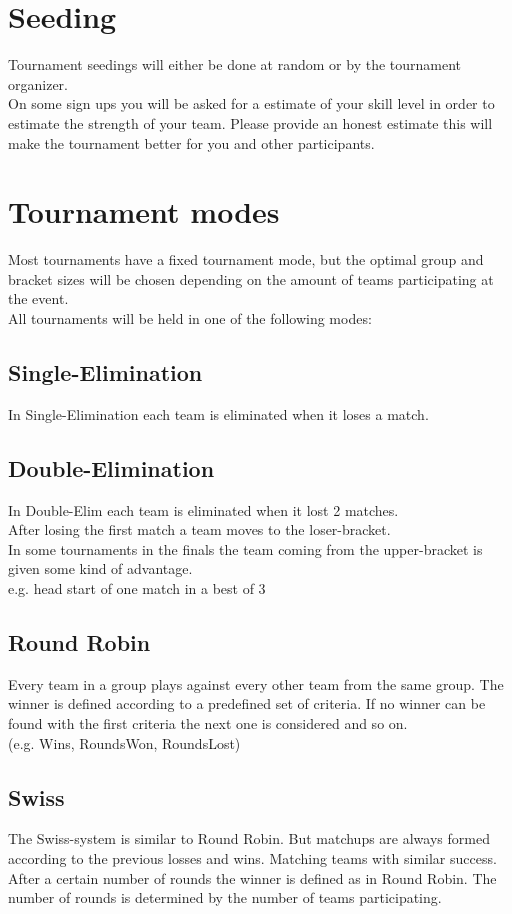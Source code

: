 \documentclass{article}
\begin{document}
\section{Seeding}
Tournament seedings will either be done at random or by the tournament organizer.\\
On some sign ups you will be asked for a estimate of your skill level in order to estimate the strength of your team.
Please provide an honest estimate this will make the tournament better for you and other participants.


\section{Tournament modes}
Most tournaments have a fixed tournament mode, but the optimal group and bracket sizes will be chosen depending on the amount of teams participating at the event.\\
All tournaments will be held in one of the following modes:

\subsection{Single-Elimination}
In Single-Elimination each team is eliminated when it loses a match.\\


\subsection{Double-Elimination}
In Double-Elim each team is eliminated when it lost 2 matches.\\
After losing the first match a team moves to the loser-bracket.\\
In some tournaments in the finals the team coming from the upper-bracket is given some kind of advantage.\\
e.g. head start of one match in a best of 3

\subsection{Round Robin}
Every team in a group plays against every other team from the same group.
The winner is defined according to a predefined set of criteria.
If no winner can be found with the first criteria the next one is considered and so on.\\
(e.g. Wins, RoundsWon, RoundsLost)

\subsection{Swiss}
The Swiss-system is similar to Round Robin. But matchups are always formed according to the previous losses and wins. Matching teams with similar success. After a certain number of rounds the winner is defined as in Round Robin. The number of rounds is determined by the number of teams participating.
\end{document}
